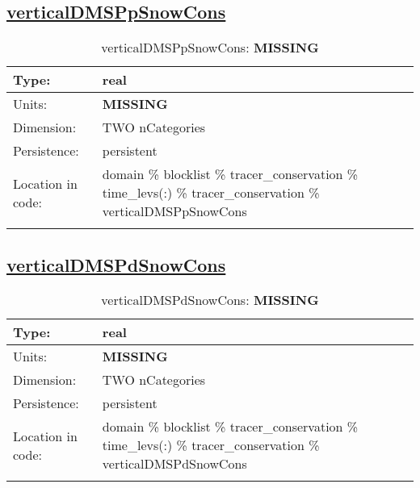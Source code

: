\subsection[verticalDMSPpSnowCons]{\hyperref[sec:var_tab_tracer_conservation]{verticalDMSPpSnowCons}}
\label{subsec:var_sec_tracer_conservation_verticalDMSPpSnowCons}
\begin{center}
\begin{longtable}{| p{2.0in} | p{4.0in} |}
        \hline 
        Type: & real \\
        \hline 
        Units: & {\bf \color{red} MISSING} \\
        \hline 
        Dimension: & TWO nCategories \\
        \hline 
        Persistence: & persistent \\
        \hline 
         Location in code: & domain \% blocklist \% tracer\_conservation \% time\_levs(:) \% tracer\_conservation \% verticalDMSPpSnowCons \\
         \hline 
    \caption{verticalDMSPpSnowCons: {\bf \color{red} MISSING}}
\end{longtable}
\end{center}
\subsection[verticalDMSPdSnowCons]{\hyperref[sec:var_tab_tracer_conservation]{verticalDMSPdSnowCons}}
\label{subsec:var_sec_tracer_conservation_verticalDMSPdSnowCons}
\begin{center}
\begin{longtable}{| p{2.0in} | p{4.0in} |}
        \hline 
        Type: & real \\
        \hline 
        Units: & {\bf \color{red} MISSING} \\
        \hline 
        Dimension: & TWO nCategories \\
        \hline 
        Persistence: & persistent \\
        \hline 
         Location in code: & domain \% blocklist \% tracer\_conservation \% time\_levs(:) \% tracer\_conservation \% verticalDMSPdSnowCons \\
         \hline 
    \caption{verticalDMSPdSnowCons: {\bf \color{red} MISSING}}
\end{longtable}
\end{center}

